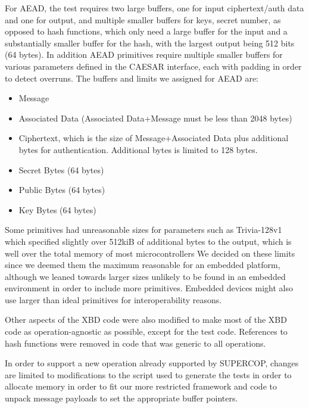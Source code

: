 \documentclass[twoside,11pt]{cergdoc}
\begin{document}
For AEAD, the test requires two large buffers, one for input ciphertext/auth data and
one for output, and multiple smaller buffers for keys, secret number,  as
opposed to hash functions, which only need a large buffer for the input and a
substantially smaller buffer for the hash, with the largest output being 512
bits (64 bytes). In addition AEAD primitives require
multiple smaller buffers for various parameters defined in the CAESAR interface,
each with padding in order to detect overruns. The buffers and limits we
assigned for AEAD are:
\begin{itemize}
    \item Message
    \item Associated Data (Associated Data+Message must be less than 2048 bytes)
    \item Ciphertext, which is the size of Message+Associated Data plus additional bytes for
        authentication. Additional bytes is limited to 128 bytes.
    \item Secret Bytes (64 bytes)
    \item Public Bytes (64 bytes) 
    \item Key Bytes (64 bytes)
\end{itemize}

Some primitives had unreasonable sizes for parameters such as Trivia-128v1 which
specified slightly over 512kiB of additional bytes to the output, which is well
over the total memory of most microcontrollers We decided on these limits since
we deemed them the maximum reasonable for an embedded platform, although we
leaned towards larger sizes unlikely to be found in an embedded environment in
order to include more primitives. Embedded devices might also use larger than
ideal primitives for interoperability reasons.

Other aspects of the XBD code were also modified to make most of the XBD code as
operation-agnostic as possible, except for the test code. References to hash
functions were removed in code that was generic to all operations. 

In order to support a new operation already supported by SUPERCOP, changes are
limited to modifications to the script used to generate the tests in order to
allocate memory in order to fit our more restricted framework and code to unpack
message payloads to set the appropriate buffer pointers.

\end{document}
